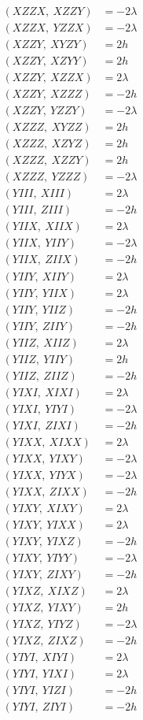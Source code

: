 \documentclass{article}
\begin{document}
\begin{align*}
  (XZZX,\ XZZY) &= - 2 \lambda \\
  (XZZX,\ YZZX) &= - 2 \lambda \\
  (XZZY,\ XYZY) &= 2 h \\
  (XZZY,\ XZYY) &= 2 h \\
  (XZZY,\ XZZX) &= 2 \lambda \\
  (XZZY,\ XZZZ) &= - 2 h \\
  (XZZY,\ YZZY) &= - 2 \lambda \\
  (XZZZ,\ XYZZ) &= 2 h \\
  (XZZZ,\ XZYZ) &= 2 h \\
  (XZZZ,\ XZZY) &= 2 h \\
  (XZZZ,\ YZZZ) &= - 2 \lambda \\
  (YIII,\ XIII) &= 2 \lambda \\
  (YIII,\ ZIII) &= - 2 h \\
  (YIIX,\ XIIX) &= 2 \lambda \\
  (YIIX,\ YIIY) &= - 2 \lambda \\
  (YIIX,\ ZIIX) &= - 2 h \\
  (YIIY,\ XIIY) &= 2 \lambda \\
  (YIIY,\ YIIX) &= 2 \lambda \\
  (YIIY,\ YIIZ) &= - 2 h \\
  (YIIY,\ ZIIY) &= - 2 h \\
  (YIIZ,\ XIIZ) &= 2 \lambda \\
  (YIIZ,\ YIIY) &= 2 h \\
  (YIIZ,\ ZIIZ) &= - 2 h \\
  (YIXI,\ XIXI) &= 2 \lambda \\
  (YIXI,\ YIYI) &= - 2 \lambda \\
  (YIXI,\ ZIXI) &= - 2 h \\
  (YIXX,\ XIXX) &= 2 \lambda \\
  (YIXX,\ YIXY) &= - 2 \lambda \\
  (YIXX,\ YIYX) &= - 2 \lambda \\
  (YIXX,\ ZIXX) &= - 2 h \\
  (YIXY,\ XIXY) &= 2 \lambda \\
  (YIXY,\ YIXX) &= 2 \lambda \\
  (YIXY,\ YIXZ) &= - 2 h \\
  (YIXY,\ YIYY) &= - 2 \lambda \\
  (YIXY,\ ZIXY) &= - 2 h \\
  (YIXZ,\ XIXZ) &= 2 \lambda \\
  (YIXZ,\ YIXY) &= 2 h \\
  (YIXZ,\ YIYZ) &= - 2 \lambda \\
  (YIXZ,\ ZIXZ) &= - 2 h \\
  (YIYI,\ XIYI) &= 2 \lambda \\
  (YIYI,\ YIXI) &= 2 \lambda \\
  (YIYI,\ YIZI) &= - 2 h \\
  (YIYI,\ ZIYI) &= - 2 h
\end{align*}
\end{document}
